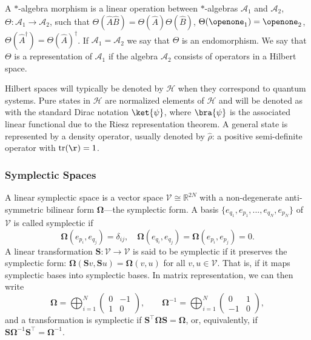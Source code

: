 A $\ast$-algebra morphism is a linear operation between $\ast$-algebras $\mathcal{A}_1$ and $\mathcal{A}_2$, $\Theta:\mathcal{A}_1\to\mathcal{A}_2$, such that $\Theta(\hat{A}\hat{B}) = \Theta(\hat{A})\Theta(\hat{B})$, $\Theta(\openone_1) = \openone_2$, $\Theta(\hat{A}^\dagger) = \Theta(\hat{A})^\dagger$. If $\mathcal{A}_1 = \mathcal{A}_2$ we say that $\Theta$ is an endomorphism. We say that $\Theta$ is a representation of $\mathcal{A}_1$ if the algebra $\mathcal{A}_2$ consists of operators in a Hilbert space.

Hilbert spaces will typically be denoted by $\mathscr{H}$ when they correspond to quantum systems. Pure states in $\mathscr{H}$ are normalized elements of $\mathscr{H}$ and will be denoted as with the standard Dirac notation $\ket{\psi}$, where $\bra{\psi}$ is the associated linear functional due to the Riesz representation theorem. A general state is represented by a density operator, usually denoted by $\hat{\rho}$: a positive semi-definite operator with $\text{tr}(\r) = 1$. 


\subsubsection*{Symplectic Spaces}

A linear symplectic space is a vector space $\mathcal{V}\cong \mathbb{R}^{2N}$ with a non-degenerate anti-symmetric bilinear form $\bm \Omega$---the symplectic form. A basis $\{ e_{q_1},  e_{p_1},..., e_{q_N}, e_{p_N}\}$ of $\mathcal{V}$ is called symplectic if 
\begin{equation}
    \bm \Omega( e_{p_i}, e_{q_j}) = \delta_{ij}, \quad \bm \Omega( e_{q_i}, e_{q_j}) =\bm \Omega( e_{p_i}, e_{p_j}) = 0.
\end{equation}
A linear transformation $\bm S:\mathcal{V}\to\mathcal{V}$ is said to be symplectic if it preserves the symplectic form: $\bm \Omega(\bm Sv,\bm Su) = \bm \Omega(v,u)$ for all $v,u\in \mathcal{V}$. That is, if it maps symplectic bases into symplectic bases. In matrix representation, we can then write
\begin{equation}
    \bm \Omega = \bigoplus_{i=1}^N \begin{pmatrix} 0 & -1 \\ 1 & 0\end{pmatrix}, \quad \quad
    \bm \Omega^{-1} = \bigoplus_{i=1}^N \begin{pmatrix} 0 & 1 \\ -1 & 0\end{pmatrix},
\end{equation}
and a transformation is symplectic if $\bm S^\intercal \bm \Omega\bm S = \bm \Omega$, or, equivalently, if $\bm S \bm \Omega^{-1} \bm S^\intercal = \bm  \Omega^{-1}$.

